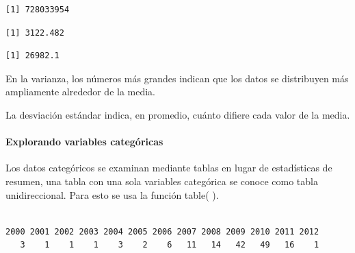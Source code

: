 \documentclass[
  letterpaper,
  DIV=11,
  numbers=noendperiod]{scrartcl}
\let\oldparagraph\paragraph
\renewcommand{\paragraph}[1]{\oldparagraph{#1}\mbox{}}
\newenvironment{Shaded}{\begin{snugshade}}{\end{snugshade}}
\newcommand{\CommentTok}[1]{\textcolor[rgb]{0.37,0.37,0.37}{#1}}
\newcommand{\FunctionTok}[1]{\textcolor[rgb]{0.28,0.35,0.67}{#1}}
\newcommand{\NormalTok}[1]{\textcolor[rgb]{0.00,0.23,0.31}{#1}}
\newcommand{\SpecialCharTok}[1]{\textcolor[rgb]{0.37,0.37,0.37}{#1}}
\begin{document}
\begin{verbatim}
[1] 728033954
\end{verbatim}

\begin{Shaded}
\end{Shaded}

\begin{verbatim}
[1] 3122.482
\end{verbatim}

\begin{Shaded}
\end{Shaded}

\begin{verbatim}
[1] 26982.1
\end{verbatim}

En la varianza, los números más grandes indican que los datos se
distribuyen más ampliamente alrededor de la media.

La desviación estándar indica, en promedio, cuánto difiere cada valor de
la media.

\hypertarget{explorando-variables-categuxf3ricas}{%
\paragraph{Explorando variables
categóricas}\label{explorando-variables-categuxf3ricas}}

Los datos categóricos se examinan mediante tablas en lugar de
estadísticas de resumen, una tabla con una sola variables categórica se
conoce como tabla unidireccional. Para esto se usa la función table( ).

\begin{Shaded}
\end{Shaded}

\begin{verbatim}

2000 2001 2002 2003 2004 2005 2006 2007 2008 2009 2010 2011 2012 
   3    1    1    1    3    2    6   11   14   42   49   16    1 
\end{verbatim}
\end{document}
